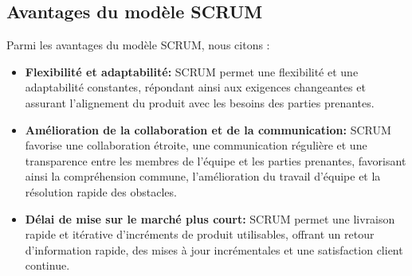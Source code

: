 \subsection{Avantages du modèle SCRUM}
\vspace{5mm}
Parmi les avantages du modèle SCRUM, nous citons : 
\par\vspace{4mm}
\begin{itemize}[label=$\bullet$]
    \item \textbf{Flexibilité et adaptabilité: } SCRUM permet une flexibilité et une adaptabilité constantes, répondant ainsi aux exigences changeantes et assurant l'alignement du produit avec les besoins des parties prenantes.
          \vspace{4mm}
    \item \textbf{Amélioration de la collaboration et de la communication:}  SCRUM favorise une collaboration étroite, une communication régulière et une transparence entre les membres de l'équipe et les parties prenantes, favorisant ainsi la compréhension commune, l'amélioration du travail d'équipe et la résolution rapide des obstacles.
          \vspace{4mm}
    \item \textbf{Délai de mise sur le marché plus court:}   SCRUM permet une livraison rapide et itérative d'incréments de produit utilisables, offrant un retour d'information rapide, des mises à jour incrémentales et une satisfaction client continue.
\end{itemize}
\vspace{5mm}

